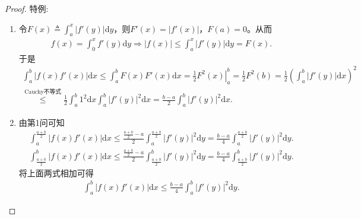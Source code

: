 \documentclass[../../main.tex]{subfiles}%
\begin{document}
\begin{proof}

{\heiti 特例:}
\begin{enumerate}
\item 令\(F(x) \triangleq \int_{a}^{x}|f'(y)|\mathrm{d}y\)，则\(F'(x) = |f'(x)|\)，\(F(a) = 0\)。从而
\begin{align*}
f(x) = \int_{0}^{x}f'(y)\mathrm{d}y \Rightarrow |f(x)| \leqslant \int_{a}^{x}|f'(y)|\mathrm{d}y = F(x).
\end{align*}
于是
\begin{align*}
\int_{a}^{b}|f(x)f'(x)|\mathrm{d}x \leqslant \int_{a}^{b}F(x)F'(x)\mathrm{d}x = \left.\frac{1}{2}F^2(x)\right|_{a}^{b} = \frac{1}{2}F^2(b) = \frac{1}{2}\left( \int_{a}^{b}|f'(y)|\mathrm{d}x \right)^2 \\
\overset{\text{Cauchy不等式}}{\leqslant} \frac{1}{2}\int_{a}^{b}1^2\mathrm{d}x \int_{a}^{b}|f'(y)|^2\mathrm{d}x = \frac{b - a}{2}\int_{a}^{b}|f'(y)|^2\mathrm{d}x.
\end{align*}

\item 由第1问可知
\begin{align*}
\int_{a}^{\frac{a + b}{2}}|f(x)f'(x)|\mathrm{d}x \leqslant \frac{\frac{a + b}{2} - a}{2}\int_{a}^{\frac{a + b}{2}}|f'(y)|^2\mathrm{d}y = \frac{b - a}{4}\int_{a}^{\frac{a + b}{2}}|f'(y)|^2\mathrm{d}y.
\end{align*}
\begin{align*}
\int_{\frac{a + b}{2}}^{b}|f(x)f'(x)|\mathrm{d}x \leqslant \frac{\frac{a + b}{2} - a}{2}\int_{\frac{a + b}{2}}^{b}|f'(y)|^2\mathrm{d}y = \frac{b - a}{4}\int_{\frac{a + b}{2}}^{b}|f'(y)|^2\mathrm{d}y.
\end{align*}
将上面两式相加可得
\begin{align*}
\int_{a}^{b}|f(x)f'(x)|\mathrm{d}x \leqslant \frac{b - a}{4}\int_{a}^{b}|f'(y)|^2\mathrm{d}y.
\end{align*}
\end{enumerate}


\end{proof}
\end{document}
